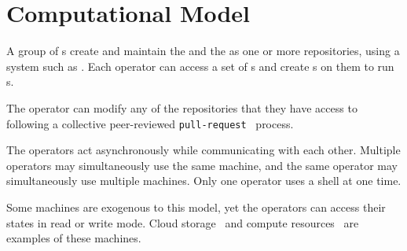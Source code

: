 \section{Computational Model}\label{computation_model}

A group of s create and maintain the  and the  as one or more repositories, using a system such as . Each operator can access a set of s and create s on them to run s. 



The operator can modify any of the repositories that they have access to following a collective peer-reviewed \texttt{pull-request}~\cite{pull_request} process.

The operators act asynchronously while communicating with each other. Multiple operators may simultaneously use the same machine, and the same operator may simultaneously use multiple machines. Only one operator uses a shell at one time. 

Some machines are exogenous to this model, yet the operators can access their states in read or write mode. Cloud storage~\cite{aws_s3} and compute resources~\cite{aws_batch} are examples of these machines.

